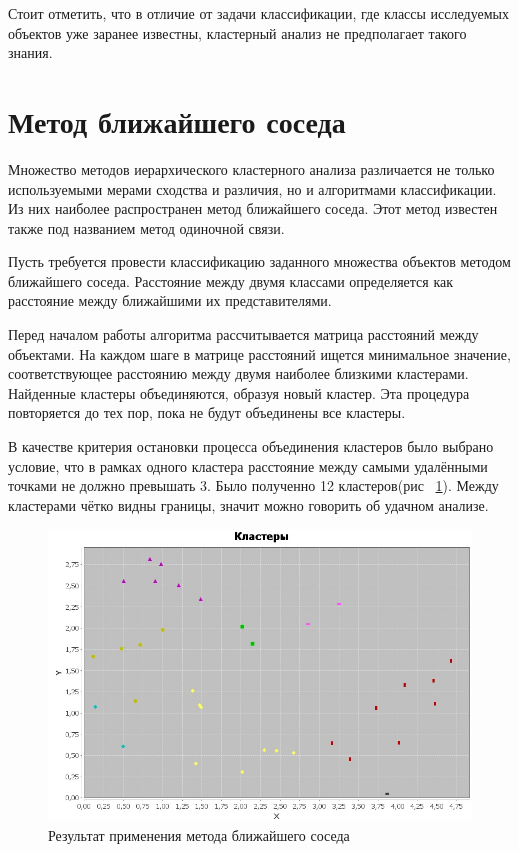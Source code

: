 \documentclass[a4paper,12pt]{article}
\begin{document}
\vspace{0.5cm}
Стоит отметить, что в отличие от задачи классификации, где классы исследуемых объектов уже заранее известны, кластерный анализ не предполагает такого знания.

\newpage\section{Метод ближайшего соседа}

Множество методов иерархического кластерного анализа различается не только используемыми мерами сходства и различия, но и алгоритмами классификации. Из них наиболее распространен метод ближайшего соседа. Этот метод известен также под названием метод одиночной связи.

\vspace{0.5cm}
Пусть требуется провести классификацию заданного множества объектов методом ближайшего соседа. Расстояние между двумя классами определяется как расстояние между ближайшими их представителями.

\vspace{0.5cm}
Перед началом работы алгоритма рассчитывается матрица расстояний между объектами. На каждом шаге в матрице расстояний ищется минимальное значение, соответствующее расстоянию между двумя наиболее близкими кластерами. Найденные кластеры объединяются, образуя новый кластер. Эта процедура повторяется до тех пор, пока не будут объединены все кластеры.

\vspace{0.5cm}

В качестве критерия остановки процесса объединения кластеров было выбрано условие, что в рамках одного кластера расстояние между самыми удалёнными точками не должно превышать 3. Было полученно 12 кластеров(рис ~\ref{fig:im_1}). Между кластерами чётко видны границы, значит можно говорить об удачном анализе.

\begin{center}
	\begin{figure}[h]
	\includegraphics[scale=0.8]{figure_1.png}
	\caption{Результат применения метода ближайшего соседа}
	\label{fig:im_1}
	\end{figure}
\end{center}
\end{document}
